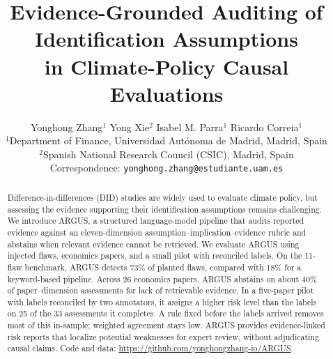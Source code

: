 \documentclass[11pt]{article}
\title{Evidence-Grounded Auditing of Identification Assumptions\\
in Climate-Policy Causal Evaluations}
\author{
  Yonghong Zhang$^{1}$ \quad Yong Xie$^{2}$ \quad
  Isabel M. Parra$^{1}$ \quad Ricardo Correia$^{1}$ \\
  $^{1}$Department of Finance, Universidad Aut\'onoma de Madrid, Madrid, Spain \\
  $^{2}$Spanish National Research Council (CSIC), Madrid, Spain \\
  Correspondence: \texttt{yonghong.zhang@estudiante.uam.es}
}
\newcommand{\sys}{ARGUS}
\begin{document}
\maketitle

\begin{abstract}
Difference-in-differences (DID) studies are widely used to evaluate climate
policy, but assessing the evidence supporting their identification assumptions
remains challenging. We introduce \sys{}, a structured language-model pipeline
that audits reported evidence against an eleven-dimension
assumption--implication--evidence rubric and abstains when relevant evidence
cannot be retrieved. We evaluate \sys{} using injected flaws, economics
papers, and a small pilot with reconciled labels. On the 11-flaw benchmark,
\sys{} detects $73\%$ of planted flaws, compared with $18\%$ for a keyword-based
pipeline. Across 26 economics papers, \sys{} abstains on about $40\%$ of
paper--dimension assessments for lack of retrievable evidence. In a five-paper
pilot with labels reconciled by two annotators, it assigns a higher risk level
than the labels on 25 of the 33 assessments it completes. A rule fixed before
the labels arrived removes most of this in-sample; weighted agreement stays low. \sys{} provides evidence-linked risk reports
that localize potential weaknesses for expert review, without adjudicating
causal claims. Code and data:
\url{https://github.com/yonghongzhang-io/ARGUS}.
\end{abstract}













\appendix

\end{document}
